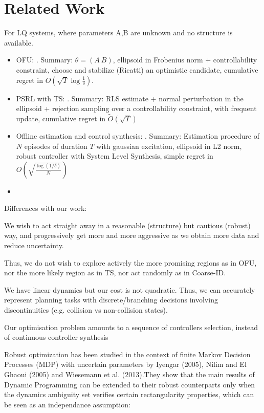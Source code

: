 \documentclass{article}
\begin{document}
\section{Related Work}

For LQ systems, where parameters A,B are unknown and no structure is available.
\begin{itemize}
    \item OFU: \citep{abbasi-yadkori11a}. Summary: $\theta=(A~B)$, ellipsoid in Frobenius norm + controllability constraint, choose and stabilize (Ricatti) an optimistic candidate, cumulative regret in $O(\sqrt{T}\log\frac{1}{\delta})$.
    \item PSRL with TS: \citep{abeille18a}. Summary: RLS estimate + normal perturbation in the ellipsoid + rejection sampling over a controllability constraint, with frequent update, cumulative regret in $\tilde{O}(\sqrt{T})$
    \item Offline estimation and control synthesis: \citep{Dean2017}. Summary: Estimation procedure of $N$ episodes of duration $T$ with gaussian excitation, ellipsoid in L2 norm, robust controller with System Level Synthesis, simple regret in $O(\sqrt{\frac{\log(1/\delta)}{N}})$
    \item \citep{Dean2018}
\end{itemize}

Differences with our work:
    
    We wish to act straight away in a reasonable (structure) but cautious (robust) way, and progressively get more and more aggressive as we obtain more data and reduce uncertainty.
    
    Thus, we do not wish to explore actively the more promising regions as in OFU, nor the more likely region as in TS, nor act randomly as in Coarse-ID.
    
    We have linear dynamics but our cost is not quadratic. Thus, we can accurately represent planning tasks with discrete/branching decisions involving discontinuities (e.g. collision vs non-collision states).
    
    Our optimisation problem amounts to a sequence of controllers selection, instead of continuous controller synthesis


Robust optimization has been studied in the context of finite Markov Decision Processes (MDP) with uncertain parameters by Iyengar (2005), Nilim and El Ghaoui (2005) and Wiesemann et al. (2013).They show that the main results of Dynamic Programming can be extended to their robust counterparts only when the dynamics ambiguity set verifies certain rectangularity properties, which can be seen as an independance assumption: 
\end{document}
